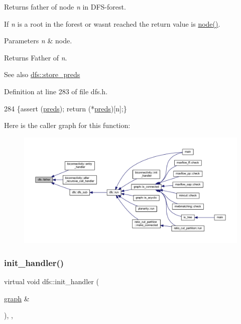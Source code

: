 Returns father of node {\itshape n} in D\+F\+S-\/forest. 

If {\itshape n} is a root in the forest or wasn\textquotesingle{}t reached the return value is {\ttfamily \mbox{\hyperlink{classnode}{node()}}}.


\begin{DoxyParams}{Parameters}
{\em n} & node. \\
\hline
\end{DoxyParams}
\begin{DoxyReturn}{Returns}
Father of {\itshape n}. 
\end{DoxyReturn}
\begin{DoxySeeAlso}{See also}
\mbox{\hyperlink{classdfs_a7043f46eb3887cbcbb1391fc783407a4}{dfs\+::store\+\_\+preds}} 
\end{DoxySeeAlso}


Definition at line 283 of file dfs.\+h.


\begin{DoxyCode}
284     \{assert (\mbox{\hyperlink{classdfs_a3fdeb5a211a1bc1753b2a637258c5355}{preds}}); \textcolor{keywordflow}{return} (*\mbox{\hyperlink{classdfs_a3fdeb5a211a1bc1753b2a637258c5355}{preds}})[n];\}
\end{DoxyCode}
Here is the caller graph for this function\+:
\nopagebreak
\begin{figure}[H]
\begin{center}
\leavevmode
\includegraphics[width=350pt]{classdfs_a3012717ce541b3e56943e2c2c50efdf6_icgraph}
\end{center}
\end{figure}
\mbox{\label{classdfs_aae46a50d0c73c63bf72e483668fd22a2}} 
\subsubsection{\texorpdfstring{init\+\_\+handler()}{init\_handler()}}
{\footnotesize\ttfamily virtual void dfs\+::init\+\_\+handler (\begin{DoxyParamCaption}\item[{\mbox{\hyperlink{classgraph}{graph}} \&}]{ }\end{DoxyParamCaption})\hspace{0.3cm}{\ttfamily [inline]}, {\ttfamily [virtual]}, {\ttfamily [inherited]}}



